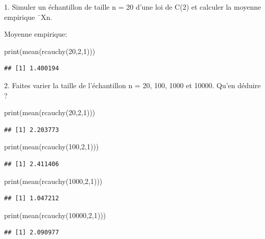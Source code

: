 \documentclass[
]{article}
\newenvironment{Shaded}{\begin{snugshade}}{\end{snugshade}}
\newcommand{\DecValTok}[1]{\textcolor[rgb]{0.00,0.00,0.81}{#1}}
\newcommand{\FunctionTok}[1]{\textcolor[rgb]{0.00,0.00,0.00}{#1}}
\newcommand{\NormalTok}[1]{#1}
\begin{document}
1. Simuler un échantillon de taille n = 20 d'une loi de C(2) et calculer
la moyenne empirique ¯Xn.

Moyenne empirique:

\begin{Shaded}
\begin{Highlighting}[]
\FunctionTok{print}\NormalTok{(}\FunctionTok{mean}\NormalTok{(}\FunctionTok{rcauchy}\NormalTok{(}\DecValTok{20}\NormalTok{,}\DecValTok{2}\NormalTok{,}\DecValTok{1}\NormalTok{)))}
\end{Highlighting}
\end{Shaded}

\begin{verbatim}
## [1] 1.400194
\end{verbatim}

2. Faites varier la taille de l'échantillon n = 20, 100, 1000 et 10000.
Qu'en déduire ?

\begin{Shaded}
\begin{Highlighting}[]
\FunctionTok{print}\NormalTok{(}\FunctionTok{mean}\NormalTok{(}\FunctionTok{rcauchy}\NormalTok{(}\DecValTok{20}\NormalTok{,}\DecValTok{2}\NormalTok{,}\DecValTok{1}\NormalTok{)))}
\end{Highlighting}
\end{Shaded}

\begin{verbatim}
## [1] 2.203773
\end{verbatim}

\begin{Shaded}
\begin{Highlighting}[]
\FunctionTok{print}\NormalTok{(}\FunctionTok{mean}\NormalTok{(}\FunctionTok{rcauchy}\NormalTok{(}\DecValTok{100}\NormalTok{,}\DecValTok{2}\NormalTok{,}\DecValTok{1}\NormalTok{)))}
\end{Highlighting}
\end{Shaded}

\begin{verbatim}
## [1] 2.411406
\end{verbatim}

\begin{Shaded}
\begin{Highlighting}[]
\FunctionTok{print}\NormalTok{(}\FunctionTok{mean}\NormalTok{(}\FunctionTok{rcauchy}\NormalTok{(}\DecValTok{1000}\NormalTok{,}\DecValTok{2}\NormalTok{,}\DecValTok{1}\NormalTok{)))}
\end{Highlighting}
\end{Shaded}

\begin{verbatim}
## [1] 1.047212
\end{verbatim}

\begin{Shaded}
\begin{Highlighting}[]
\FunctionTok{print}\NormalTok{(}\FunctionTok{mean}\NormalTok{(}\FunctionTok{rcauchy}\NormalTok{(}\DecValTok{10000}\NormalTok{,}\DecValTok{2}\NormalTok{,}\DecValTok{1}\NormalTok{)))}
\end{Highlighting}
\end{Shaded}

\begin{verbatim}
## [1] 2.090977
\end{verbatim}
\end{document}
